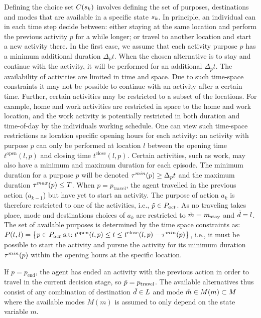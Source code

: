 Defining the choice set $C(s_{k})$ involves defining the set of purposes, destinations and modes that are available in a specific state $s_{k}$.
In principle, an individual can in each time step decide between: either staying at the same location and perform the previous activity $p$ for a while longer; or travel to another location and start a new activity there. In the first case, we assume that each activity purpose $p$ has a minimum additional duration $\Delta_p t$. When the chosen alternative is to stay and continue with the activity, it will be performed for an additional $\Delta_p t$.
The availability of activities are limited in time and space. 
Due to such time-space constraints it may not be possible to continue with an activity after a certain time. Further, certain activities may be restricted to a subset of the locations. For example, home and work activities are restricted in space to the home and work location, and the work activity is potentially restricted in both duration and time-of-day by the individuals working schedule. One can view such time-space restrictions as location specific opening hours for each activity: an activity with purpose $p$ can only be performed at location $l$ between the opening time $t^{\text{open}}({l,p})$ and closing time $t^{\text{close}}({l,p})$. Certain activities, such as work, may also have a minimum and maximum duration for each episode. The minimum duration for a purpose $p$ will be denoted $\tau^{min}(p)\geq \Delta_p t$ and the maximum duration $\tau^{max}(p)\leq T$. 
When $p=p_\text{travel}$, the agent travelled in the previous action ($a_{k-1}$) but have yet to start an activity. The purpose of action $a_k$ is therefore restricted to one of the activities, i.e., $\tilde{p} \in P_{act}$. As no traveling takes place, mode and destinations choices of $a_k$ are restricted to $\tilde{m} = m_{\text{stay}}$ and $\tilde{d}=l$. The set of available purposes is determined by the time space constraints as:
$P(t,l) = \big \{ p \in P_{act} \;\text{s.t:} \; t^{\text{open}}({l,p}) \leq t \leq t^{\text{close}}({l,p}) - \tau^{min}(p) \big \} $, i.e., it must be possible to start the activity and pursue the activity for its minimum duration $\tau^{min}(p)$ within the opening hours at the specific location.



If $p=p_\text{end}$, the agent has ended an activity with the previous action in order to travel in the current decision stage, so $\tilde{p}=p_\text{travel}$. The available alternatives thus consist of any combination of destination $\tilde{d} \in L$ and mode $\tilde{m}\in M(m)\subset M$ where the available modes $M(m)$ is assumed to only depend on the state variable $m$. 


